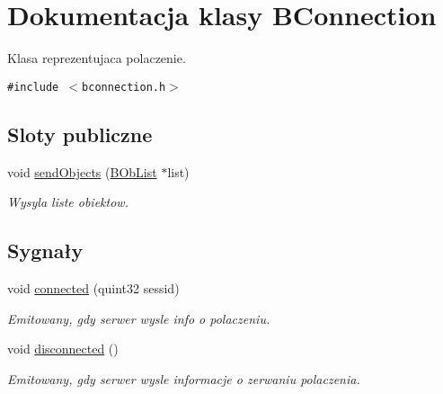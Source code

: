 \hypertarget{class_b_connection}{
\section{Dokumentacja klasy BConnection}
\label{class_b_connection}
}
Klasa reprezentujaca polaczenie.  


{\tt \#include $<$bconnection.h$>$}

\subsection*{Sloty publiczne}
\begin{CompactItemize}
\item 
void \hyperlink{class_b_connection_348456770c1f73c004ea60d03fca1a41}{sendObjects} (\hyperlink{class_b_ob_list}{BObList} $\ast$list)
\begin{CompactList}\small\item\em Wysyla liste obiektow. \item\end{CompactList}\end{CompactItemize}
\subsection*{Sygnały}
\begin{CompactItemize}
\item 
void \hyperlink{class_b_connection_90dca3f0343427e31bb4544a8accf56d}{connected} (quint32 sessid)
\begin{CompactList}\small\item\em Emitowany, gdy serwer wysle info o polaczeniu. \item\end{CompactList}\item 
\hypertarget{class_b_connection_20fa85863f4cb396d3141e01d4928fd4}{
void \hyperlink{class_b_connection_20fa85863f4cb396d3141e01d4928fd4}{disconnected} ()}
\label{class_b_connection_20fa85863f4cb396d3141e01d4928fd4}

\begin{CompactList}\small\item\em Emitowany, gdy serwer wysle informacje o zerwaniu polaczenia. \item\end{CompactList}\end{CompactItemize}
